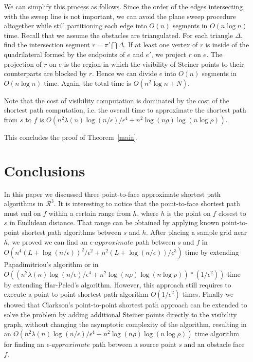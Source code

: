 \documentclass{llncs}
\begin{document}
We can simplify this process as follows.
Since the order of the edges intersecting with the sweep line is not important, we
can avoid the plane sweep procedure altogether while still partitioning each edge into $O(n)$ segments
in $O(n\log n)$ time. Recall that we assume the obstacles are triangulated. For each triangle $\Delta$, find the
intersection segment $r=\pi' \bigcap \Delta$. If at least one vertex of $r$ is inside of the quadrilateral
formed by the endpoints of $e$ and $e'$, we project $r$ on $e$. The projection of $r$ on $e$ is the
region in which the visibility of Steiner points to their counterparts are blocked by $r$. Hence we can
divide $e$ into $O(n)$ segments in $O(n\log n)$ time. Again, the total time is $O(n^2\log n+N)$.

Note that the cost of visibility computation is dominated by the cost of the shortest path computation, i.e. the overall time to approximate the shortest path from $s$ to $f$ is $O(n^2\lambda(n)\log(n/\epsilon)/{\epsilon}^4+n^2\log(n\rho)\log(n\log\rho))$.

This concludes the proof of Theorem~\ref{main}.

\section{Conclusions}
In this paper we discussed three point-to-face approximate shortest path algorithms
in $\mathcal{R}^3$.
It is interesting to notice that the point-to-face shortest
path must end on $f$ within a certain range from $h$, where $h$ is the point on $f$ closest to $s$ in
Euclidean distance. That range can be obtained by applying known point-to-point shortest path algorithms
between $s$ and $h$. After placing a sample grid near $h$, we proved we
can find an $\epsilon$-$approximate$ path
between $s$ and $f$ in $O(n^4(L+\log(n/\epsilon))^2/\epsilon^2+n^2(L+\log(n/\epsilon))/\epsilon^3)$ time
by extending Papadimitriou's algorithm or in
$O((n^2\lambda(n)\log(n/\epsilon)/{\epsilon}^4+n^2\log (n\rho) \log(n\log\rho))*(1/\epsilon^2))$ time by
extending Har-Peled's algorithm. However, this approach still requires to execute a point-to-point
shortest path algorithm $O(1/\epsilon^2)$ times.
Finally we showed that Clarkson's point-to-point shortest path approach can be extended to solve the
problem by adding additional Steiner points directly to the visibility graph, without changing the
asymptotic complexity of the algorithm, resulting in an
$O(n^2\lambda(n)\log(n/\epsilon)/{\epsilon}^4+n^2\log(n\rho)\log(n\log\rho))$ time algorithm for finding
an $\epsilon$-$approximate$ path between a source point $s$ and an obstacle face $f$.
\end{document}
